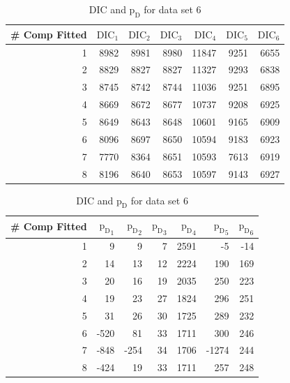 \begin{table}[!htb]
\centering
\caption{DIC and $\text{p}_\text{D}$ for data set 6}
\label{table : ds_5wellsep_dic}
\begin{tabular}{@{}rrrrrrr@{}}
\toprule
\# Comp Fitted & $\text{DIC}_1$ & $\text{DIC}_2$  & $\text{DIC}_3$  & $\text{DIC}_4$  & $\text{DIC}_5$  & $\text{DIC}_6$  \\ \midrule
1 & 8982 & 8981 & 8980 & 11847 & 9251 & 6655 \\
2 & 8829 & 8827 & 8827 & 11327 & 9293 & 6838 \\
3 & 8745 & 8742 & 8744 & 11036 & 9251 & 6895 \\
4 & 8669 & 8672 & 8677 & 10737 & 9208 & 6925 \\
5 & 8649 & 8643 & 8648 & 10601 & 9165 & 6909 \\
6 & 8096 & 8697 & 8650 & 10594 & 9183 & 6923 \\
7 & 7770 & 8364 & 8651 & 10593 & 7613 & 6919 \\
8 & 8196 & 8640 & 8653 & 10597 & 9143 & 6927 \\ \bottomrule
\end{tabular}

\begin{tabular}{@{}rrrrrrr@{}}
\toprule
\# Comp Fitted & ${\text{p}_\text{D}}_1$ & ${\text{p}_\text{D}}_2$ & ${\text{p}_\text{D}}_3$ & ${\text{p}_\text{D}}_4$ & ${\text{p}_\text{D}}_5$ & ${\text{p}_\text{D}}_6$ \\ \midrule
1 & 9 & 9 & 7 & 2591 & -5 & -14 \\
2 & 14 & 13 & 12 & 2224 & 190 & 169 \\
3 & 20 & 16 & 19 & 2035 & 250 & 223 \\
4 & 19 & 23 & 27 & 1824 & 296 & 251 \\
5 & 31 & 26 & 30 & 1725 & 289 & 232 \\
6 & -520 & 81 & 33 & 1711 & 300 & 246 \\
7 & -848 & -254 & 34 & 1706 & -1274 & 244 \\
8 & -424 & 19 & 33 & 1711 & 257 & 248 \\ \bottomrule
\end{tabular}
\end{table}


